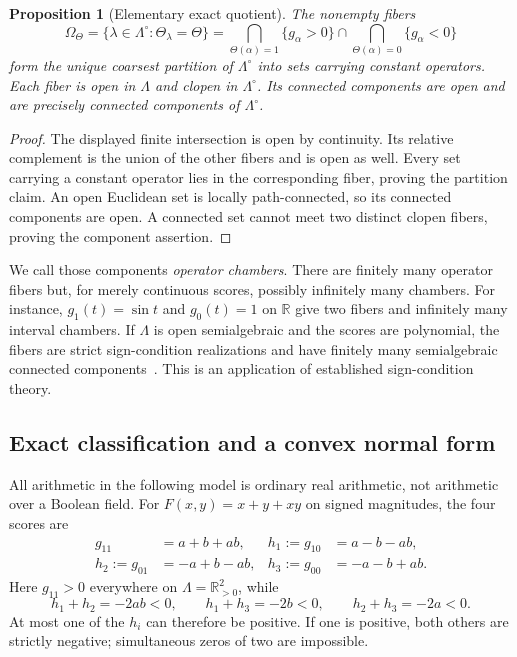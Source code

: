 \documentclass[11pt]{article}
\newtheorem{proposition}[theorem]{Proposition}
\theoremstyle{definition}
\theoremstyle{remark}
\newcommand{\R}{\mathbb R}
\begin{document}
\begin{proposition}[Elementary exact quotient]\label{prop:quotient}
The nonempty fibers
\[
 \Omega_\Theta=\{\lambda\in\Lambda^\circ:\Theta_\lambda=\Theta\}
 =\bigcap_{\Theta(\alpha)=1}\{g_\alpha>0\}
  \cap\bigcap_{\Theta(\alpha)=0}\{g_\alpha<0\}
\]
form the unique coarsest partition of $\Lambda^\circ$ into sets carrying constant operators. Each fiber is open in $\Lambda$ and clopen in $\Lambda^\circ$. Its connected components are open and are precisely connected components of $\Lambda^\circ$.
\end{proposition}
\begin{proof}
The displayed finite intersection is open by continuity. Its relative complement is the union of the other fibers and is open as well. Every set carrying a constant operator lies in the corresponding fiber, proving the partition claim. An open Euclidean set is locally path-connected, so its connected components are open. A connected set cannot meet two distinct clopen fibers, proving the component assertion.
\end{proof}
We call those components \emph{operator chambers}. There are finitely many operator fibers but, for merely continuous scores, possibly infinitely many chambers. For instance, $g_1(t)=\sin t$ and $g_0(t)=1$ on $\R$ give two fibers and infinitely many interval chambers. If $\Lambda$ is open semialgebraic and the scores are polynomial, the fibers are strict sign-condition realizations and have finitely many semialgebraic connected components~\cite{BPR2006,BPR2009,JPS2010}. This is an application of established sign-condition theory.

\subsection{Exact classification and a convex normal form}
All arithmetic in the following model is ordinary real arithmetic, not arithmetic over a Boolean field. For $F(x,y)=x+y+xy$ on signed magnitudes, the four scores are
\begin{equation}\label{eq:scores}
 \begin{aligned}
 g_{11}&=a+b+ab,& h_1:=g_{10}&=a-b-ab,\\
 h_2:=g_{01}&=-a+b-ab,& h_3:=g_{00}&=-a-b+ab.
 \end{aligned}
\end{equation}
Here $g_{11}>0$ everywhere on $\Lambda=\R_{>0}^2$, while
\begin{equation}\label{eq:pairs}
 h_1+h_2=-2ab<0,\qquad h_1+h_3=-2b<0,\qquad h_2+h_3=-2a<0.
\end{equation}
At most one of the $h_i$ can therefore be positive. If one is positive, both others are strictly negative; simultaneous zeros of two are impossible.
\end{document}
